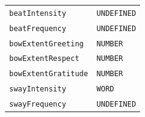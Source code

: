 \documentclass{CSSRforAfrica}
\begin{document}
\begin{table}[H]
\begin{tabular}{l l}
{\footnotesize \verb+beatIntensity+}  	                                          & {\footnotesize \verb+UNDEFINED+}\vspace{-1.5mm}   \\
{\footnotesize \verb+beatFrequency+}  	                                          & {\footnotesize \verb+UNDEFINED+}\vspace{-1.5mm}   \\
{\footnotesize \verb+bowExtentGreeting+} 	                                  & {\footnotesize \verb+NUMBER+} \vspace{-1.5mm}\\
{\footnotesize \verb+bowExtentRespect+} 	                                  & {\footnotesize \verb+NUMBER+} \vspace{-1.5mm}\\
{\footnotesize \verb+bowExtentGratitude+} 	                                  & {\footnotesize \verb+NUMBER+} \vspace{-1.5mm}\\
{\footnotesize \verb+swayIntensity+} 	                                         & {\footnotesize \verb+WORD+} \vspace{-1.5mm}\\
{\footnotesize \verb+swayFrequency+}  	                                   & {\footnotesize \verb+UNDEFINED+}\vspace{-1.5mm}   \\
\end{tabular}
\end{table}
 
\end{document}
